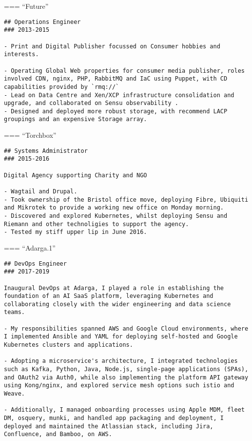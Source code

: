 \documentclass[
]{article}
\begin{document}
=== ``Future''

\begin{verbatim}
## Operations Engineer
### 2013-2015

- Print and Digital Publisher focussed on Consumer hobbies and interests.

- Operating Global Web properties for consumer media publisher, roles involved CDN, nginx, PHP, RabbitMQ and IaC using Puppet, with CD capabilities provided by `rmq://`
- Lead on Data Centre and Xen/XCP infrastructure consolidation and upgrade, and collaborated on Sensu observability .
- Designed and deployed more robust storage, with recommend LACP groupings and an expensive Storage array.
\end{verbatim}

=== ``Torchbox''

\begin{verbatim}
## Systems Administrator
### 2015-2016

Digital Agency supporting Charity and NGO

- Wagtail and Drupal.
- Took ownership of the Bristol office move, deploying Fibre, Ubiquiti and Mikrotek to provide a working new office on Monday morning.
- Discovered and explored Kubernetes, whilst deploying Sensu and Riemann and other technoligies to support the agency.
- Tested my stiff upper lip in June 2016. 
\end{verbatim}

=== ``Adarga.1''

\begin{verbatim}
## DevOps Engineer
### 2017-2019

Inaugural DevOps at Adarga, I played a role in establishing the foundation of an AI SaaS platform, leveraging Kubernetes and collaborating closely with the wider engineering and data science teams.

- My responsibilities spanned AWS and Google Cloud environments, where I implemented Ansible and YAML for deploying self-hosted and Google Kubernetes clusters and applications.

- Adopting a microservice's architecture, I integrated technologies such as Kafka, Python, Java, Node.js, single-page applications (SPAs), and OAuth2 via Auth0, while also implementing the platform API gateway using Kong/nginx, and explored service mesh options such istio and Weave.

- Additionally, I managed onboarding processes using Apple MDM, fleet DM, osquery, munki, and handled app packaging and deployment, I deployed and maintained the Atlassian stack, including Jira, Confluence, and Bamboo, on AWS.
\end{verbatim}
\end{document}
